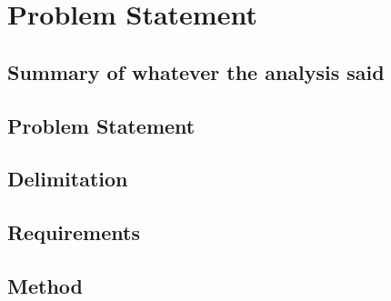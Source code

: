 \chapter{Problem Statement}
\section{Summary of whatever the analysis said}
\section{Problem Statement}
\section{Delimitation}
\section{Requirements}
\section{Method}